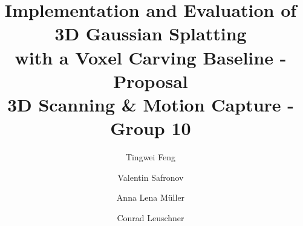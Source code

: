 \documentclass[10pt,twocolumn,letterpaper]{article}
\title{
Implementation and Evaluation of 3D Gaussian Splatting\\with a Voxel Carving Baseline - Proposal\\[0.8em]

\large 3D Scanning \& Motion Capture - Group 10
}
\author{
Tingwei Feng
\and
Valentin Safronov
\and
Anna Lena Müller
\and
Conrad Leuschner
}
\begin{document}
\maketitle



{
    \small
    
    
}
\end{document}

